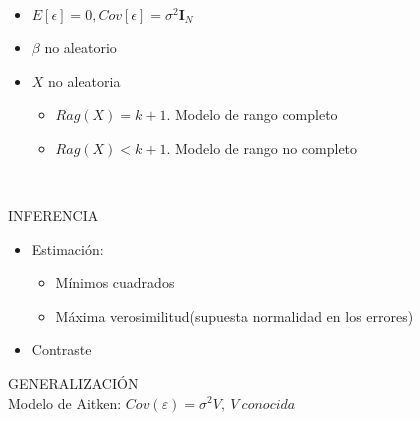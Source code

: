 \documentclass[10pt,a4paper]{book}
\begin{document}
\begin{itemize}
\item $E[\epsilon]=0,Cov[\epsilon]=\sigma^2\mathbf{I}_N$
\item $\beta$ no aleatorio
\item $X$ no aleatoria
\begin{itemize}
\item $Rag(X)=k+1$. Modelo de rango completo
\item $Rag(X)<k+1$. Modelo de rango no completo
\end{itemize}
\end{itemize}
\ \\
\begin{center}
INFERENCIA
\end{center}
\begin{itemize}
\item Estimación:
\begin{itemize}
\item Mínimos cuadrados
\item Máxima verosimilitud(supuesta normalidad en los errores)
\end{itemize}
\item Contraste
\end{itemize}
\begin{center}
GENERALIZACIÓN
\ \\
Modelo de Aitken: $Cov(\varepsilon)=\sigma^2V,\ V\ conocida$
\end{center}
\end{document}
